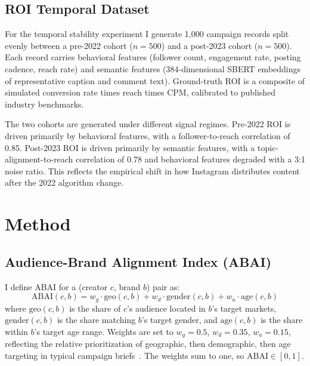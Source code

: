 \documentclass[conference]{IEEEtran}
\begin{document}
\subsection{ROI Temporal Dataset}

For the temporal stability experiment I generate 1{,}000 campaign records
split evenly between a pre-2022 cohort ($n=500$) and a post-2023 cohort
($n=500$). Each record carries behavioral features (follower count,
engagement rate, posting cadence, reach rate) and semantic features
(384-dimensional SBERT embeddings of representative caption and comment
text). Ground-truth ROI is a composite of simulated conversion rate times
reach times CPM, calibrated to published industry benchmarks.

The two cohorts are generated under different signal regimes. Pre-2022 ROI
is driven primarily by behavioral features, with a follower-to-reach
correlation of 0.85. Post-2023 ROI is driven primarily by semantic
features, with a topic-alignment-to-reach correlation of 0.78 and
behavioral features degraded with a 3:1 noise ratio. This reflects the
empirical shift in how Instagram distributes content after the 2022
algorithm change.

\section{Method}

\subsection{Audience-Brand Alignment Index (ABAI)}

I define ABAI for a (creator $c$, brand $b$) pair as:
\begin{equation}
  \text{ABAI}(c,b) = w_g \cdot \text{geo}(c,b)
                   + w_d \cdot \text{gender}(c,b)
                   + w_a \cdot \text{age}(c,b)
  \label{eq:abai}
\end{equation}
where $\text{geo}(c,b)$ is the share of $c$'s audience located in $b$'s
target markets, $\text{gender}(c,b)$ is the share matching $b$'s target
gender, and $\text{age}(c,b)$ is the share within $b$'s target age range.
Weights are set to $w_g\!=\!0.5$, $w_d\!=\!0.35$, $w_a\!=\!0.15$,
reflecting the relative prioritization of geographic, then demographic,
then age targeting in typical campaign briefs~\cite{imhub2024}. The
weights sum to one, so $\text{ABAI} \in [0,1]$.
\end{document}
